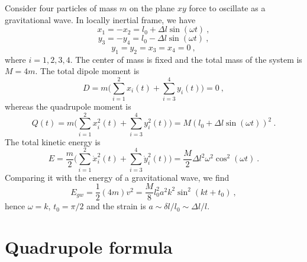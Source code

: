     Consider four particles of mass $m$ on the plane $xy$ force to oscillate as a gravitational wave. In locally inertial frame, we have 
    \begin{equation*}
        x_1 = - x_2 = l_0 + \Delta l \sin(\omega t) ~,
    \end{equation*}
    \begin{equation*}
        y_3 = - y_4 = l_0 - \Delta l \sin(\omega t) ~,
    \end{equation*}
    \begin{equation*}
        y_1 = y_2 = x_3 = x_4 = 0 ~,
    \end{equation*}
    where $i = 1, 2, 3, 4$. The center of mass is fixed and the total mass of the system is $M = 4m$. The total dipole moment is 
    \begin{equation*}
        D = m \Big ( \sum_{i=1}^2 x_i (t) + \sum_{i=3}^4 y_i (t)  \Big) = 0 ~,
    \end{equation*}
    whereas the quadrupole moment is 
    \begin{equation*}
        Q(t) = m \Big ( \sum_{i=1}^2 x_i^2 (t) + \sum_{i=3}^4 y_i^2 (t)  \Big) = M (l_0 + \Delta l \sin(\omega t))^2 ~.
    \end{equation*}
    The total kinetic energy is 
    \begin{equation*}
        E = \frac{m}{2} \Big ( \sum_{i=1}^2 \dot x_i^2 (t) + \sum_{i=3}^4 \dot y_i^2 (t)  \Big) = \frac{M}{2} \Delta l^2 \omega^2 \cos^2 (\omega t) ~.
    \end{equation*}
    Comparing it with the energy of a gravitational wave, we find 
    \begin{equation*}
        E_{gw} = \frac{1}{2} (4m) v^2 = \frac{M}{8} l_0^2 a^2 k^2 \sin^2 (kt + t_0) ~,
    \end{equation*}
    hence $\omega = k$, $t_0 = \pi / 2$ and the strain is $a \sim \delta l / l_0 \sim \Delta l / l$. 

\section{Quadrupole formula}

